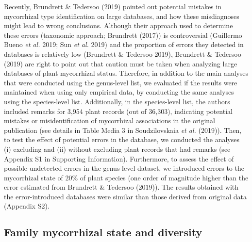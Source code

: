 \documentclass[12pt,]{article}
\begin{document}
Recently, Brundrett \& Tedersoo (2019) pointed out potential mistakes in
mycorrhizal type identification on large databases, and how these
misdiagnoses might lead to wrong conclusions. Although their approach
used to determine these errors (taxonomic approach; Brundrett (2017)) is
controversial (Guillermo Bueno \emph{et al.} 2019; Sun \emph{et al.}
2019) and the proportion of errors they detected in databases is
relatively low (Brundrett \& Tedersoo 2019), Brundrett \& Tedersoo
(2019) are right to point out that caution must be taken when analyzing
large databases of plant mycorrhizal status. Therefore, in addition to
the main analyses that were conducted using the genus-level list, we
evaluated if the results were maintained when using only empirical data,
by conducting the same analyses using the species-level list.
Additionally, in the species-level list, the authors included remarks
for 3,954 plant records (out of 36,303), indicating potential mistakes
or misidentification of mycorrhizal associations in the original
publication (see details in Table Media 3 in Soudzilovskaia \emph{et
al.} (2019)). Then, to test the effect of potential errors in the
database, we conducted the analyses (i) excluding and (ii) without
excluding plant records that had remarks (see Appendix S1 in Supporting
Information). Furthermore, to assess the effect of possible undetected
errors in the genus-level dataset, we introduced errors to the
mycorrhizal state of 20\% of plant species (one order of magnitude
higher than the error estimated from Brundrett \& Tedersoo (2019)). The
results obtained with the error-introduced databases were similar than
those derived from original data (Appendix S2).

\hypertarget{family-mycorrhizal-state-and-diversity}{%
\subsection{Family mycorrhizal state and
diversity}\label{family-mycorrhizal-state-and-diversity}}
\end{document}
